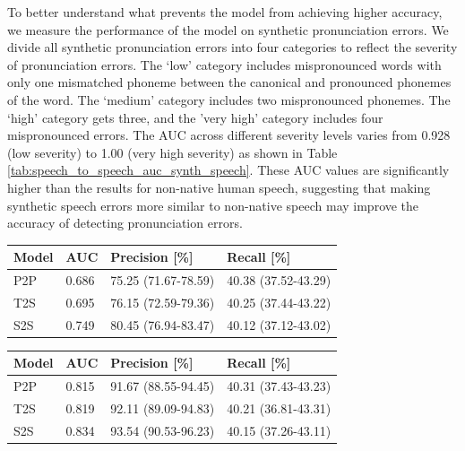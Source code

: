 \documentclass[]{interact}
\theoremstyle{plain}%
\theoremstyle{definition}
\theoremstyle{remark}
\begin{document}
To better understand what prevents the model from achieving higher accuracy, we measure the performance of the model on synthetic pronunciation errors. We divide all synthetic pronunciation errors into four categories to reflect the severity of pronunciation errors. The `low' category includes mispronounced words with only one mismatched phoneme between the canonical and pronounced phonemes of the word. The `medium' category  includes two mispronounced phonemes. The `high' category gets three, and the 'very high' category includes four mispronounced errors. The AUC across different severity levels varies from 0.928 (low severity) to 1.00 (very high severity) as shown in Table \ref{tab:speech_to_speech_auc_synth_speech}. These AUC values are significantly higher than the results for non-native human  speech, suggesting that making synthetic speech errors more similar to non-native speech may improve the accuracy of detecting pronunciation errors.

\begin{table}
  {
  \centering
   \begin{tabular}{llll}
    \toprule
     Model & AUC & Precision [\%] & Recall [\%] \\
    \midrule
     P2P & 0.686 &  75.25 (71.67-78.59) & 40.38 (37.52-43.29) \\   
     T2S & 0.695 & 76.15 (72.59-79.36) & 40.25 (37.44-43.22) \\ 
     S2S & 0.749 & 80.45 (76.94-83.47) & 40.12 (37.12-43.02) \\  
    \bottomrule
  \end{tabular}
  }
  \label{tab:speech_to_speech_auc_results}
\end{table}

\begin{table}
  {
  \centering
   \begin{tabular}{llll}
    \toprule
     Model & AUC & Precision [\%] & Recall [\%] \\
    \midrule
     P2P & 0.815 &  91.67 (88.55-94.45)   & 40.31 (37.43-43.23) \\   
     T2S & 0.819 & 92.11 (89.09-94.83) & 40.21 (36.81-43.31)\\  
     S2S & 0.834 & 93.54 (90.53-96.23)  & 40.15 (37.26-43.11)\\  
    \bottomrule
  \end{tabular}
  }
  \label{tab:speech_to_speech_auc_results_high_sev_real_speech}
\end{table}
\end{document}
